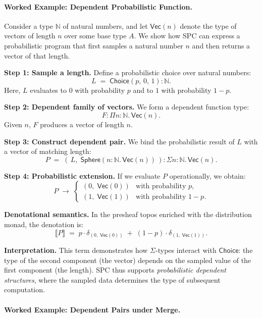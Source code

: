 \documentclass{article}
\begin{document}
\paragraph{Worked Example: Dependent Probabilistic Function.}

Consider a type $\mathbb{N}$ of natural numbers, and let $\mathsf{Vec}(n)$ denote
the type of vectors of length $n$ over some base type $A$. We show how SPC can
express a probabilistic program that first samples a natural number $n$ and then
returns a vector of that length.

\medskip
\textbf{Step 1: Sample a length.}  
Define a probabilistic choice over natural numbers:
\[
L \;=\; \mathsf{Choice}(p,\,0,\,1) : \mathbb{N}.
\]
Here, $L$ evaluates to $0$ with probability $p$ and to $1$ with probability
$1-p$.

\medskip
\textbf{Step 2: Dependent family of vectors.}  
We form a dependent function type:
\[
F : \Pi n:\mathbb{N}.\, \mathsf{Vec}(n).
\]
Given $n$, $F$ produces a vector of length $n$.

\medskip
\textbf{Step 3: Construct dependent pair.}  
We bind the probabilistic result of $L$ with a vector of matching length:
\[
P \;=\; (\,L,\; \mathsf{Sphere}(n{:}\mathbb{N}.\, \mathsf{Vec}(n))\,) 
   : \Sigma n:\mathbb{N}.\,\mathsf{Vec}(n).
\]

\medskip
\textbf{Step 4: Probabilistic extension.}  
If we evaluate $P$ operationally, we obtain:
\[
P \;\to\; \begin{cases}
(0,\; \mathsf{Vec}(0)) & \text{with probability } p,\\[4pt]
(1,\; \mathsf{Vec}(1)) & \text{with probability } 1-p.
\end{cases}
\]

\medskip
\textbf{Denotational semantics.}  
In the presheaf topos enriched with the distribution monad, the denotation is:
\[
\llbracket P \rrbracket \;=\;
p \cdot \delta_{(0,\;\mathsf{Vec}(0))} \;+\;
(1-p) \cdot \delta_{(1,\;\mathsf{Vec}(1))}.
\]

\medskip
\textbf{Interpretation.}  
This term demonstrates how $\Sigma$-types interact with $\mathsf{Choice}$:
the type of the second component (the vector) depends on the sampled value of
the first component (the length). SPC thus supports \emph{probabilistic dependent
structures}, where the sampled data determines the type of subsequent
computation.

\paragraph{Worked Example: Dependent Pairs under Merge.}
\end{document}
